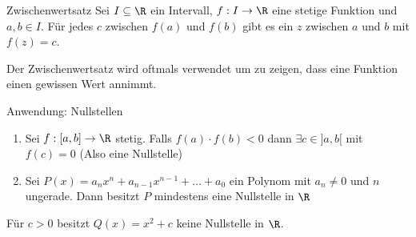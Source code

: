 
\begin{lemma} {Zwischenwertsatz}
    Sei $I \subseteq \R$ ein Intervall, $f: I \to \R$ eine stetige Funktion und $a,b \in I$. Für jedes $c$ zwischen $f(a)$ und $f(b)$ gibt es ein $z$ zwischen $a$ und $b$ mit $f(z) = c$.
\end{lemma}
\noindent Der Zwischenwertsatz wird oftmals verwendet um zu zeigen, dass eine Funktion einen gewissen Wert annimmt.
\begin{KR}{Anwendung: Nullstellen}
    \begin{enumerate}
        \item Sei $f:[a,b] \to \R$ stetig. Falls $f(a) \cdot f(b) < 0$ dann $\exists c \in ]a,b[$ mit $f(c) = 0$ (Also eine Nullstelle)
        \item  Sei $P(x) = a_n x^n + a_{n-1}x^{n-1} + \ldots + a_0$ ein Polynom mit $a_n \neq 0$ und $n$ ungerade. Dann besitzt $P$ mindestens eine Nullstelle in $\R$
    \end{enumerate}
\end{KR}
Für $c > 0$ besitzt $Q(x) = x^2 + c$ keine Nullstelle in $\R$.
